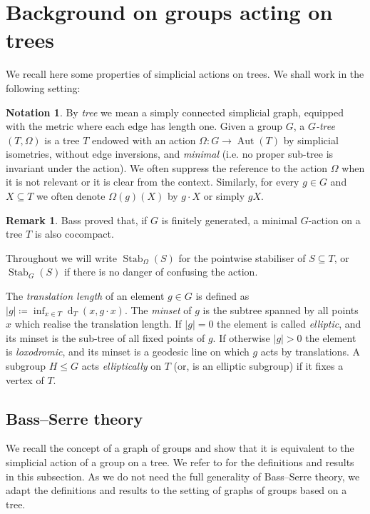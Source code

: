 \documentclass[svgnames]{amsart}
\theoremstyle{plain}
\theoremstyle{definition}
\newtheorem{rem}[thm]{Remark}
\newtheorem{notation}[thm]{Notation}
\newcommand{\aut}[1]{\operatorname{Aut}(#1)}
\newcommand{\Stab}[2]{\operatorname{Stab}_{#1}\left(#2\right)}
\newcommand{\dist}{\operatorname{d}}
\begin{document}
\section{Background on groups acting on trees}\label{sec:background}
\noindent We recall here some properties of simplicial actions on trees. We shall work in the following setting:

\begin{notation}\label{notation:action_on_trees}
    By \emph{tree} we mean a simply connected simplicial graph, equipped with the metric where each edge has length one. Given a group $G$, a \emph{$G$-tree} $(T,\Omega)$ is a tree $T$ endowed with an action $\Omega\colon G\to \aut{T}$ by simplicial isometries, without edge inversions, and \emph{minimal} (i.e. no proper sub-tree is invariant under the action). We often suppress the reference to the action $\Omega$ when it is not relevant or it is clear from the context. Similarly, for every $g\in G$ and $X\subseteq T$ we often denote $\Omega(g)(X)$ by $g\cdot X$ or simply $gX$. 
\end{notation}
\begin{rem}
    Bass \cite[Proposition~7.9]{Bass} proved that, if $G$ is finitely generated, a minimal $G$-action on a tree $T$ is also cocompact.
\end{rem}

\noindent Throughout we will write $\Stab{\Omega}{S}$ for the pointwise stabiliser of $S \subseteq T$, or $\Stab{G}{S}$ if there is no danger of confusing the action. 


 The \emph{translation length} of an element $g\in G$ is defined as $|g|\coloneq\inf_{x\in T}\dist_T(x,g\cdot x)$. The \emph{minset} of $g$ is the subtree spanned by all points $x$ which realise the translation length.  If $|g|=0$ the element is called \emph{elliptic}, and its minset is the sub-tree of all fixed points of $g$. If otherwise $|g|>0$ the element is \emph{loxodromic}, and its minset is a geodesic line on which $g$ acts by translations. A subgroup $H\le G$ acts \emph{elliptically} on $T$ (or, is an elliptic subgroup) if it fixes a vertex of $T$.

\subsection{Bass--Serre theory} We recall the concept of a graph of groups and show that it is equivalent to the simplicial action of a group on a tree. We refer to \cite{trees} for the definitions and results in this subsection. As we do not need the full generality of Bass--Serre theory, we adapt the definitions and results to the setting of graphs of groups based on a tree. 
\end{document}
